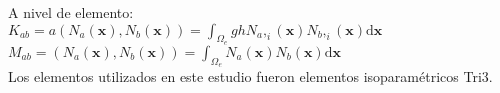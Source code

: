 A nivel de elemento:\\

$K_{ab} = a(N_a(\boldsymbol{x}), N_b(\boldsymbol{x})) = \int_{\Omega_e} gh N_a,_i(\boldsymbol{x}) N_b,_i(\boldsymbol{x}) \mathrm{d}\boldsymbol{x} $\\

$M_{ab} = (N_a(\boldsymbol{x}), N_b(\boldsymbol{x})) = \int_{\Omega_e} N_a(\boldsymbol{x}) N_b(\boldsymbol{x}) \mathrm{d}\boldsymbol{x} $\\

Los elementos utilizados en este estudio fueron elementos isoparam\'etricos Tri3. 






